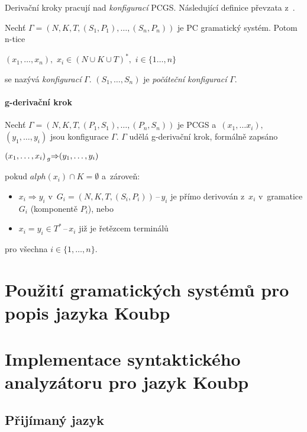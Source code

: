 Derivační kroky pracují nad \emph{konfigurací} PCGS.
Následující definice převzata z~\cite{Various-communications-in-PC-grammar-systems}.
\begin{definition}
    Nechť $\Gamma = (N, K, T, (S_1, P_1), \ldots, (S_n, P_n))$ je PC gramatický systém.
    Potom n-tice
    \begin{center}
        $(x_1, \ldots, x_n),$ $x_i \in (N \cup K \cup T)^*,$ $i \in \{1 \ldots, n\}$
    \end{center}
    se nazývá \emph{konfigurací} $\Gamma$. $(S_1, \ldots, S_n)$ je \emph{počáteční konfigurací} $\Gamma$.
\end{definition}

\subsubsection*{g-derivační krok}
Nechť $\Gamma = (N, K, T, (P_1, S_1), \ldots, (P_n, S_n))$ je PCGS a~$(x_1, \ldots x_i),$ $(y_1, \ldots, y_i)$ jsou konfigurace $\Gamma$.
$\Gamma$ udělá g-derivační krok, formálně zapsáno
\begin{center}
    $(x_1, \ldots, x_i) \prescript{}{g}{\Rightarrow} (y_1, \ldots, y_i)$
\end{center}
pokud $alph(x_i) \cap K = \emptyset$ a~zároveň:
\begin{itemize}
    \item $x_i \Rightarrow y_i$ v~$G_i = (N, K, T, (S_i, P_i))$\,--\,$y_i$ je přímo derivován z~$x_i$ v~gramatice $G_i$ (komponentě $P_i$), nebo
    \item $x_i = y_i \in T^*$\,--\,$x_i$ již je řetězcem terminálů
\end{itemize}   
pro všechna $i \in \{1, \ldots, n\}$.


\chapter{Použití gramatických systémů pro popis jazyka Koubp}

\chapter{Implementace syntaktického analyzátoru pro jazyk Koubp }\label{7_implementace}


\section{Přijímaný jazyk}


